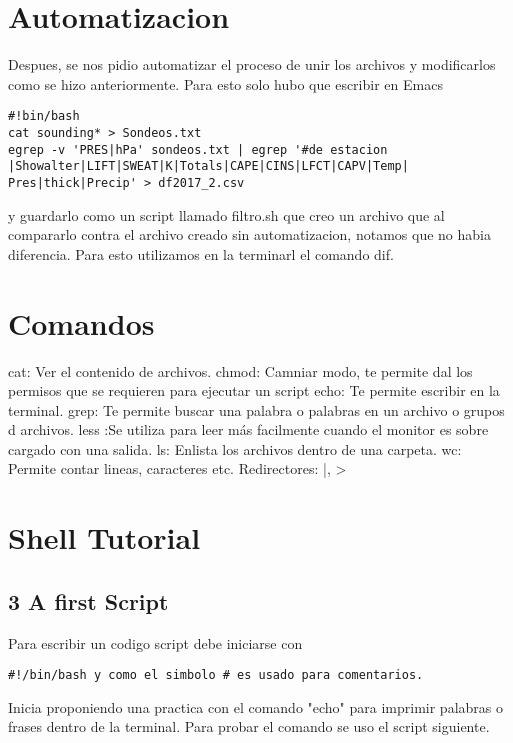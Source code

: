 \documentclass[a4paper]{article}
\begin{document}
\section{Automatizacion}
Despues, se nos pidio automatizar el proceso de unir los archivos y modificarlos como se hizo anteriormente. Para esto solo hubo que escribir en Emacs 
\begin{verbatim}
#!bin/bash
cat sounding* > Sondeos.txt
egrep -v 'PRES|hPa' sondeos.txt | egrep '#de estacion
|Showalter|LIFT|SWEAT|K|Totals|CAPE|CINS|LFCT|CAPV|Temp|
Pres|thick|Precip' > df2017_2.csv

\end{verbatim}

y guardarlo como un script llamado filtro.sh que creo un archivo que al compararlo contra el archivo creado sin automatizacion, notamos que no habia diferencia. Para esto utilizamos en la terminarl el comando dif. 

\section{Comandos}

    cat: Ver el contenido de archivos.
    chmod: Camniar modo, te permite dal los permisos que se requieren para ejecutar un script
    echo: Te permite escribir en la terminal.
    grep: Te permite buscar una palabra o palabras en un archivo o grupos d archivos.
    less :Se utiliza para leer más facilmente cuando el monitor es sobre cargado con una salida. 
    ls: Enlista los archivos dentro de una carpeta. 
    wc: Permite contar lineas, caracteres etc.
    Redirectores: |, >


\section{Shell Tutorial}

\subsection{3 A first Script}
 Para escribir un codigo script debe iniciarse con
\begin{verbatim}
#!/bin/bash y como el simbolo # es usado para comentarios.
\end{verbatim}

Inicia proponiendo una practica con el comando "echo" para imprimir palabras o frases dentro de la terminal. Para probar el comando se uso el script siguiente.
\end{document}
